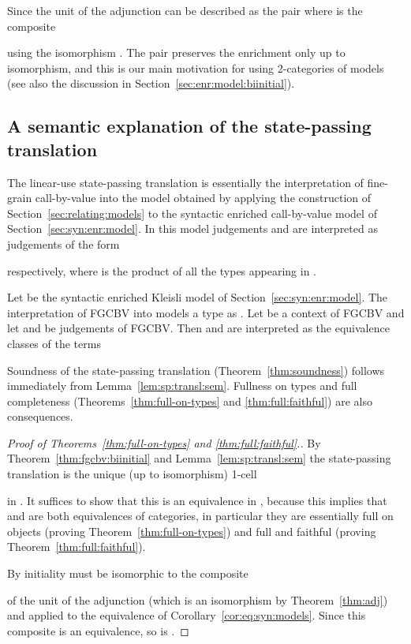 \documentclass{LMCS}
\newenvironment{proofof}[1]{\begin{proof}[Proof of {#1}.]}{\end{proof}}
\newcommand{\Klmodel}{enriched Kleisli model}
\newcommand{\enrmodel}{enriched call-by-value model}
\begin{document}
Since 
 the unit of the adjunction 
can be described as the pair  where  is the composite

using the isomorphism .
The pair  preserves the enrichment only up to isomorphism, 
and  
this is our main motivation for using 2-categories of models
(see also the discussion in Section~\ref{sec:enr:model:biinitial}).


\subsection{A semantic explanation of the state-passing translation}
\label{sec:sp:transl:semantics}

The linear-use state-passing translation is essentially the
interpretation of fine-grain call-by-value into the model obtained
by applying the construction  of
Section~\ref{sec:relating:models} to the syntactic {\enrmodel} of
Section~\ref{sec:syn:enr:model}. In this model judgements
 and  are interpreted as
judgements of the form

respectively, where  is the product of all the types appearing in .

\begin{lem} \label{lem:sp:transl:sem}
Let  be the syntactic {\Klmodel} of Section~\ref{sec:syn:enr:model}. 
The interpretation of FGCBV into  models a type  as . Let  be a context of FGCBV and let  and  be judgements of FGCBV. Then  and  are interpreted as the equivalence classes of the terms

\end{lem}

Soundness of the state-passing translation
(Theorem~\ref{thm:soundness}) follows immediately 
from Lemma~\ref{lem:sp:transl:sem}.
Fullness on types and 
full completeness (Theorems~\ref{thm:full-on-types} and \ref{thm:full:faithful})
are also  consequences.

\begin{proofof}{Theorems~\ref{thm:full-on-types} and \ref{thm:full:faithful}}
By Theorem~\ref{thm:fgcbv:biinitial} and Lemma~\ref{lem:sp:transl:sem} the state-passing translation is the unique (up to isomorphism) 1-cell

in . It suffices to show that this is an equivalence in , because this implies that  and  are both equivalences of categories, in particular they are essentially full on objects (proving Theorem~\ref{thm:full-on-types}) and full and faithful (proving Theorem~\ref{thm:full:faithful}). 

By initiality  must be isomorphic to the composite

of the unit of the adjunction (which is an isomorphism by Theorem~\ref{thm:adj}) and  applied to the equivalence of Corollary~\ref{cor:eq:syn:models}. Since this composite is an equivalence, so is . 
\end{proofof}
\end{document}
